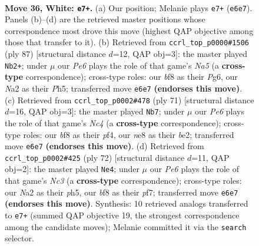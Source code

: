 \documentclass[11pt]{article}
\begin{document}
\clearpage

\begin{figure}[p]\centering
\begin{subfigure}{0.46\textwidth}\centering
\resizebox{\linewidth}{!}{%
\newchessgame
\chessboard[
  setfen={3knb2/8/4P3/2pP4/8/1P6/N2K2p1/8 w - - 0 36},
  showmover=false,
  pgfstyle=straightmove, color=movearrow, markmove={e6-e7}
]}
\caption{}
\end{subfigure}\hfill
\begin{subfigure}{0.46\textwidth}\centering
\resizebox{\linewidth}{!}{%
\newchessgame
\chessboard[
  setfen={8/8/6p1/3k3p/n7/3K3P/3N1PP1/8 b - - 9 44},
  showmover=false,
  pgfstyle=straightmove, color=movearrow, markmove={a4-b2}
]}
\caption{}
\end{subfigure}
\\[4pt]
\begin{subfigure}{0.46\textwidth}\centering
\resizebox{\linewidth}{!}{%
\newchessgame
\chessboard[
  setfen={8/4kpp1/7p/2n5/5P2/4K3/4B1PP/8 b - - 0 36},
  showmover=false,
  pgfstyle=straightmove, color=movearrow, markmove={c5-b7}
]}
\caption{}
\end{subfigure}\hfill
\begin{subfigure}{0.46\textwidth}\centering
\resizebox{\linewidth}{!}{%
\newchessgame
\chessboard[
  setfen={8/1pn2p2/2k5/5P1p/8/2N1K2P/6P1/8 w - - 3 37},
  showmover=false,
  pgfstyle=straightmove, color=movearrow, markmove={c3-e4}
]}
\caption{}
\end{subfigure}
\caption{\textbf{Move 36, White: \texttt{e7+}.} (a) Our position; Melanie plays \texttt{e7+} (\texttt{e6e7}). Panels (b)--(d) are the retrieved master positions whose correspondence most drove this move (highest QAP objective among those that transfer to it). (b) Retrieved from \texttt{ccrl\_top\_p0000\#1506} (ply 87) [structural distance $d$=12, QAP obj=3]: the master played \texttt{Nb2+}; under $\mu$ our \emph{Pe6} plays the role of that game's \emph{Na5} (a \textbf{cross-type} correspondence); cross-type roles: our \emph{b}f8 as their \emph{P}g6, our \emph{N}a2 as their \emph{P}h5; transferred move \texttt{e6e7} \textbf{(endorses this move)}. (c) Retrieved from \texttt{ccrl\_top\_p0002\#478} (ply 71) [structural distance $d$=16, QAP obj=3]: the master played \texttt{Nb7}; under $\mu$ our \emph{Pe6} plays the role of that game's \emph{Nc4} (a \textbf{cross-type} correspondence); cross-type roles: our \emph{b}f8 as their \emph{p}f4, our \emph{n}e8 as their \emph{b}e2; transferred move \texttt{e6e7} \textbf{(endorses this move)}. (d) Retrieved from \texttt{ccrl\_top\_p0002\#425} (ply 72) [structural distance $d$=11, QAP obj=2]: the master played \texttt{Ne4}; under $\mu$ our \emph{Pe6} plays the role of that game's \emph{Nc3} (a \textbf{cross-type} correspondence); cross-type roles: our \emph{N}a2 as their \emph{p}h5, our \emph{b}f8 as their \emph{p}f7; transferred move \texttt{e6e7} \textbf{(endorses this move)}. Synthesis: 10 retrieved analogs transferred to \texttt{e7+} (summed QAP objective 19, the strongest correspondence among the candidate moves); Melanie committed it via the \texttt{search} selector.}
\label{fig:thought-m70}
\end{figure}
\end{document}
